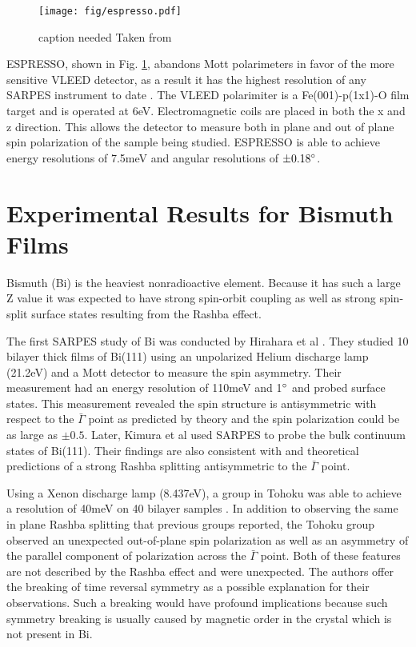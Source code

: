 \documentclass[12pt]{article}
\begin{document}
\begin{figure}[h]
  \centering
  \texttt{[image: fig/espresso.pdf]}
  \caption[should I put this here?]
  {caption needed Taken from \cite{Okuda}}
  \label{fig:espresso}
\end{figure}
ESPRESSO, shown in Fig. \ref{fig:espresso}, abandons Mott polarimeters in favor of the more sensitive VLEED detector, as a result it has the highest resolution of any SARPES instrument to date \cite{Okuda}.
The VLEED polarimiter is a Fe(001)-p(1x1)-O film target and is operated at 6eV.
Electromagnetic coils are placed in both the x and z direction.
This allows the detector to measure both in plane and out of plane spin polarization of the sample being studied.
ESPRESSO is able to achieve energy resolutions of 7.5meV and angular resolutions of $\pm0.18\degree$.

\section{Experimental Results for Bismuth Films}
Bismuth (Bi) is the heaviest nonradioactive element.
Because it has such a large Z value it was expected to have strong spin-orbit coupling as well as strong spin-split surface states resulting from the Rashba effect.

The first SARPES study of Bi was conducted by Hirahara et al \cite{Hirahara}.
They studied 10 bilayer thick films of Bi(111) using an unpolarized Helium discharge lamp (21.2eV) and a Mott detector to measure the spin asymmetry.
Their measurement had an energy resolution of 110meV and 1$\degree$ and probed surface states.
This measurement revealed the spin structure is antisymmetric with respect to the $\bar{\Gamma}$ point as predicted by theory and the spin polarization could be as large as $\pm 0.5$.
Later, Kimura et al used SARPES to probe the bulk continuum states of Bi(111).
Their findings are also consistent with \cite{Hirahara} and theoretical predictions of a strong Rashba splitting antisymmetric to the $\bar{\Gamma}$ point.

Using a Xenon discharge lamp (8.437eV), a group in Tohoku was able to achieve a resolution of 40meV on 40 bilayer samples \cite{Takayama}.
In addition to observing the same in plane Rashba splitting that previous groups reported, the Tohoku group observed an unexpected out-of-plane spin polarization as well as an asymmetry of the parallel component of polarization across the $\bar{\Gamma}$ point.
Both of these features are not described by the Rashba effect and were unexpected.
The authors offer the breaking of time reversal symmetry as a possible explanation for their observations.
Such a breaking would have profound implications because such symmetry breaking is usually caused by magnetic order in the crystal which is not present in Bi.
\end{document}
